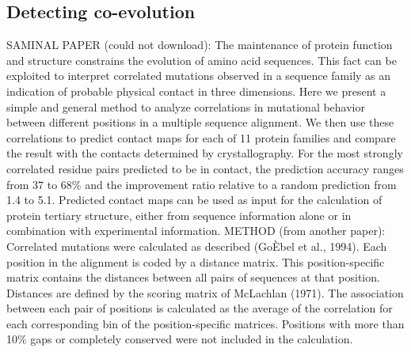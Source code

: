 
\subsection{Detecting co-evolution}

SAMINAL PAPER (could not download): The maintenance of protein function and structure constrains the evolution of amino acid sequences. This fact can be exploited to interpret correlated mutations observed in a sequence family as an indication of probable physical contact in three dimensions. Here we present a simple and general method to analyze correlations in mutational behavior between different positions in a multiple sequence alignment. We then use these correlations to predict contact maps for each of 11 protein families and compare the result with the contacts determined by crystallography. For the most strongly correlated residue pairs predicted to be in contact, the prediction accuracy ranges from 37 to 68\% and the improvement ratio relative to a random prediction from 1.4 to 5.1. Predicted contact maps can be used as input for the calculation of protein tertiary structure, either from sequence information alone or in combination with experimental information.  \cite{gobel1994correlated}
METHOD (from another paper): Correlated mutations were calculated as described (GoÈbel et al., 1994). Each position in the alignment is coded by a distance matrix. This position-specific matrix contains the distances between all pairs of sequences at that position. Distances are defined by the scoring matrix of McLachlan (1971). The association between each pair of positions is calculated as the average of the correlation for each corresponding bin of the position-specific matrices. Positions with more than 10\% gaps or completely conserved were not included in the calculation. \cite{gobel1994correlated}


